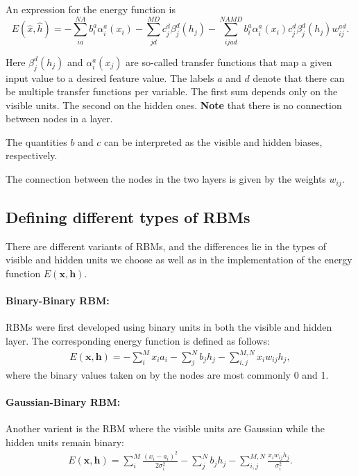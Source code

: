 \documentclass[aip,jcp,reprint,floatfix]{revtex4-1}
\begin{document}
\begin{itemize}
An expression for the energy function is
\[
E(\hat{x},\hat{h}) = -\sum_{ia}^{NA}b_i^a \alpha_i^a(x_i)-\sum_{jd}^{MD}c_j^d \beta_j^d(h_j)-\sum_{ijad}^{NAMD}b_i^a \alpha_i^a(x_i)c_j^d \beta_j^d(h_j)w_{ij}^{ad}.
\]

Here $\beta_j^d(h_j)$ and $\alpha_i^a(x_j)$ are so-called transfer functions that map a given input value to a desired feature value. The labels $a$ and $d$ denote that there can be multiple transfer functions per variable. The first sum depends only on the visible units. The second on the hidden ones. \textbf{Note} that there is no connection between nodes in a layer.

The quantities $b$ and $c$ can be interpreted as the visible and hidden biases, respectively.

The connection between the nodes in the two layers is given by the weights $w_{ij}$. 

\subsection*{Defining different types of RBMs}
There are different variants of RBMs, and the differences lie in the types of visible and hidden units we choose as well as in the implementation of the energy function $E(\mathbf{x},\mathbf{h})$. 


\paragraph{Binary-Binary RBM:}

RBMs were first developed using binary units in both the visible and hidden layer. The corresponding energy function is defined as follows:
\begin{align}
	E(\mathbf{x}, \mathbf{h}) = - \sum_i^M x_i a_i- \sum_j^N b_j h_j - \sum_{i,j}^{M,N} x_i w_{ij} h_j,
\end{align}
where the binary values taken on by the nodes are most commonly 0 and 1.




\paragraph{Gaussian-Binary RBM:}

Another varient is the RBM where the visible units are Gaussian while the hidden units remain binary:
\begin{align}
	E(\mathbf{x}, \mathbf{h}) = \sum_i^M \frac{(x_i - a_i)^2}{2\sigma_i^2} - \sum_j^N b_j h_j - \sum_{i,j}^{M,N} \frac{x_i w_{ij} h_j}{\sigma_i^2}. 
\end{align}


\end{itemize}
\end{document}
